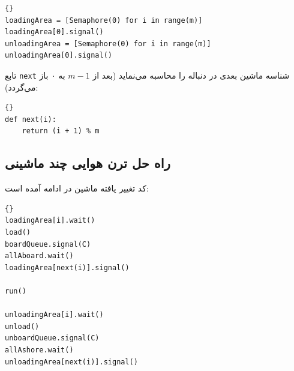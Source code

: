 \documentclass{book}
\newcommand{\clearemptydoublepage}{\newpage\cleardoublepage}
\begin{document}
\begin{latin}
\begin{latin}
\begin{lstlisting}[title=\rl{راهنمایی ترن هوایی چند ماشینی}]{}
loadingArea = [Semaphore(0) for i in range(m)]
loadingArea[0].signal()
unloadingArea = [Semaphore(0) for i in range(m)]
unloadingArea[0].signal()
\end{lstlisting}
\end{latin}
\end{latin}

    تابع {\tt next}  شناسه ماشین بعدی در دنباله را محاسبه می‌نماید (بعد از $m-1$ به ۰ باز می‌گردد):

\begin{latin}
\begin{latin}
\begin{lstlisting}[title=\rl{پیاده‌سازی  {\tt next}}]{}
def next(i):
    return (i + 1) % m
\end{lstlisting}
\end{latin}
\end{latin}



\clearemptydoublepage
\subsection{راه حل ترن هوایی چند ماشینی}

    کد تغییر یافته ماشین در ادامه آمده است: 

\begin{latin}
\begin{latin}
\begin{lstlisting}[title=\rl{راه حل ترن هوایی  چند ماشینی (ماشین)}]{} 
loadingArea[i].wait()
load()
boardQueue.signal(C)
allAboard.wait()
loadingArea[next(i)].signal()

run()

unloadingArea[i].wait()
unload()
unboardQueue.signal(C)
allAshore.wait()
unloadingArea[next(i)].signal()
\end{lstlisting}
\end{latin}
\end{latin}
\end{document}
